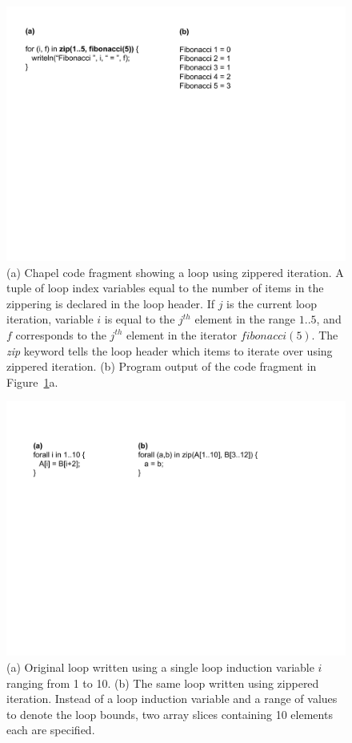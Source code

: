 \begin{figure}
	\begin{center}
	\includegraphics[scale=0.60]{./Figures/zippered_iteration}
	\caption{(a) Chapel code fragment showing a loop using zippered iteration. A tuple of loop index variables equal to the number of items in the zippering is declared in the loop header. If $j$ is the current loop iteration, variable $i$ is equal to the $j^{th}$ element in the range $1..5$, and $f$ corresponds to the $j^{th}$ element in the iterator $fibonacci(5)$. The \textit{zip} keyword tells the loop header which items to iterate over using zippered iteration. (b) Program output of the code fragment in Figure~\ref{zippered_iteration}a.}
	\label{zippered_iteration}
	\end{center}
\end{figure}

\begin{figure}
	\begin{center}
	\includegraphics[scale=0.55]{./Figures/affine_loop}
	\caption{(a) Original loop written using a single loop induction variable $i$ ranging from 1 to 10. (b) The same loop written using zippered iteration. Instead of a loop induction variable and a range of values to denote the loop bounds, two array slices containing 10 elements each are specified.}
	\label{affine_loop}
	\end{center}
\end{figure}

